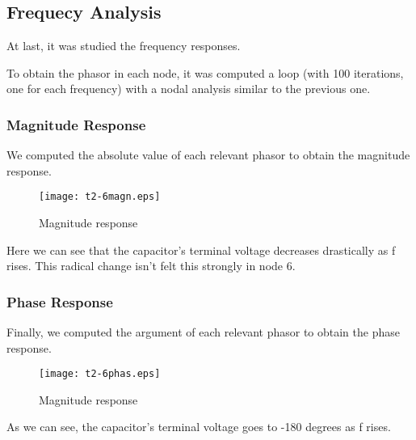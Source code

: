 \subsection{Frequecy Analysis}

At last, it was studied the frequency responses.

To obtain the phasor in each node, it was computed a loop (with 100 iterations, one for each frequency) with a nodal analysis similar to the previous one.

\subsubsection{Magnitude Response}

We computed the absolute value of each relevant phasor to obtain the magnitude response.

\begin{figure}[h] \centering
\texttt{[image: t2-6magn.eps]}
\caption{Magnitude response}\label{fig:magn}
\end{figure}

Here we can see that the capacitor's terminal voltage decreases drastically as f rises. This radical change isn't felt this strongly in node 6.


\subsubsection{Phase Response}

Finally, we computed the argument of each relevant phasor to obtain the phase response.
\begin{figure}[h] \centering
\texttt{[image: t2-6phas.eps]}
\caption{Magnitude response}\label{fig:phase}
\end{figure}

As we can see, the capacitor's terminal voltage goes to -180 degrees as f rises.

